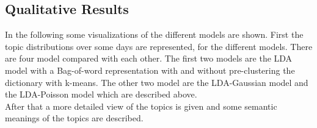 \documentclass[11pt,a4paper]{article}
\begin{document}








\subsection{Qualitative Results}
In the following some visualizations of the different models are shown. First the topic distributions over some days are represented, for the different models. There are four model compared with each other. The first two models are the LDA model with a Bag-of-word representation with and without pre-clustering the dictionary with k-means. The other two model are the LDA-Gaussian model and the LDA-Poisson model which are described above.\\
After that a more detailed view of the topics is given and some semantic meanings of the topics are described.\\
\end{document}
